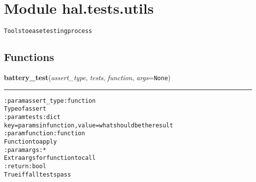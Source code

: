 %
%
%


\section{Module hal.tests.utils}

    \label{hal:tests:utils}
\begin{alltt}
Tools to ease testing process 
\end{alltt}



  \subsection{Functions}

    \label{hal:tests:utils:battery_test}

    \vspace{0.5ex}

\hspace{.8\funcindent}\begin{boxedminipage}{\funcwidth}

    \raggedright \textbf{battery\_test}(\textit{assert\_type}, \textit{tests}, \textit{function}, \textit{args}={\tt None})

    \vspace{-1.5ex}

    \rule{\textwidth}{0.5\fboxrule}
\setlength{\parskip}{2ex}
\begin{alltt}

:param assert\_type: function
    Type of assert
:param tests: dict
    key= params in function, value= what should be the result
:param function: function
    Function to apply
:param args: *
    Extra args for function to call
:return: bool
    True iff all tests pass
\end{alltt}

\setlength{\parskip}{1ex}
    \end{boxedminipage}


